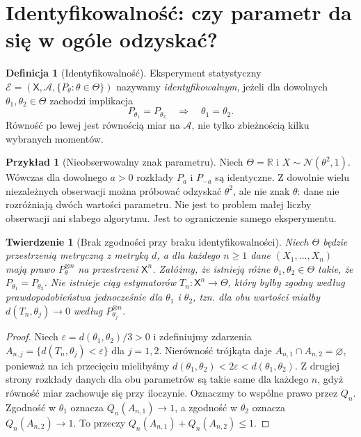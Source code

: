 \documentclass[11pt,a4paper,oneside]{report}
\numberwithin{equation}{chapter}
\theoremstyle{plain}
\newtheorem{twierdzenie}{Twierdzenie}[chapter]
\theoremstyle{definition}
\newtheorem{definicja}{Definicja}[chapter]
\newtheorem{przyklad}{Przykład}[chapter]
\theoremstyle{remark}
\newcommand{\R}{\mathbb R}
\newcommand{\calA}{\mathcal A}
\newcommand{\Normal}{\mathcal N}
\begin{document}
\section{Identyfikowalność: czy parametr da się w ogóle odzyskać?}
\begin{definicja}[Identyfikowalność]\label{def:ident}
Eksperyment statystyczny $\mathcal E=(\mathsf X,\calA,\{P_\theta:\theta\in\Theta\})$ nazywamy \emph{identyfikowalnym}, jeżeli dla dowolnych $\theta_1,\theta_2\in\Theta$ zachodzi implikacja
\[
P_{\theta_1}=P_{\theta_2}\quad\Longrightarrow\quad \theta_1=\theta_2.
\]
Równość po lewej jest równością miar na $\calA$, nie tylko zbieżnością kilku wybranych momentów.
\end{definicja}

\begin{przyklad}[Nieobserwowalny znak parametru]\label{ex:not-identifiable}
Niech $\Theta=\R$ i $X\sim\Normal(\theta^2,1)$. Wówczas dla dowolnego $a>0$ rozkłady $P_a$ i $P_{-a}$ są identyczne. Z dowolnie wielu niezależnych obserwacji można próbować odzyskać $\theta^2$, ale nie znak $\theta$: dane nie rozróżniają dwóch wartości parametru. Nie jest to problem małej liczby obserwacji ani słabego algorytmu. Jest to ograniczenie samego eksperymentu.
\end{przyklad}

\begin{twierdzenie}[Brak zgodności przy braku identyfikowalności]\label{thm:no-consistency}
Niech $\Theta$ będzie przestrzenią metryczną z metryką $d$, a dla każdego $n\ge1$ dane $(X_1,\ldots,X_n)$ mają prawo $P_\theta^{\otimes n}$ na przestrzeni $\mathsf X^n$. Załóżmy, że istnieją różne $\theta_1,\theta_2\in\Theta$ takie, że $P_{\theta_1}=P_{\theta_2}$. Nie istnieje ciąg estymatorów $T_n:\mathsf X^n\to\Theta$, który byłby zgodny według prawdopodobieństwa jednocześnie dla $\theta_1$ i $\theta_2$, tzn. dla obu wartości miałby $d(T_n,\theta_j)\to0$ według $P_{\theta_j}^{\otimes n}$.
\end{twierdzenie}
\begin{proof}
Niech $\varepsilon=d(\theta_1,\theta_2)/3>0$ i zdefiniujmy zdarzenia $A_{n,j}=\{d(T_n,\theta_j)<\varepsilon\}$ dla $j=1,2$. Nierówność trójkąta daje $A_{n,1}\cap A_{n,2}=\varnothing$, ponieważ na ich przecięciu mielibyśmy $d(\theta_1,\theta_2)<2\varepsilon<d(\theta_1,\theta_2)$. Z drugiej strony rozkłady danych dla obu parametrów są takie same dla każdego $n$, gdyż równość miar zachowuje się przy iloczynie. Oznaczmy to wspólne prawo przez $Q_n$. Zgodność w $\theta_1$ oznacza $Q_n(A_{n,1})\to1$, a zgodność w $\theta_2$ oznacza $Q_n(A_{n,2})\to1$. To przeczy $Q_n(A_{n,1})+Q_n(A_{n,2})\le1$.
\end{proof}
\end{document}
